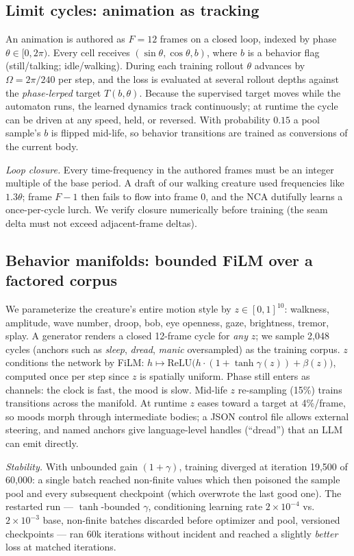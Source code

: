 \documentclass[11pt]{article}
\begin{document}
\subsection{Limit cycles: animation as tracking}
An animation is authored as $F{=}12$ frames on a closed loop, indexed by phase
$\theta \in [0, 2\pi)$. Every cell receives $(\sin\theta, \cos\theta, b)$,
where $b$ is a behavior flag (still/talking; idle/walking). During each
training rollout $\theta$ advances by $\Omega = 2\pi/240$ per step, and the
loss is evaluated at several rollout depths against the \emph{phase-lerped}
target $T(b, \theta)$. Because the supervised target moves while the automaton
runs, the learned dynamics track continuously; at runtime the cycle can be
driven at any speed, held, or reversed. With probability $0.15$ a pool
sample's $b$ is flipped mid-life, so behavior transitions are trained as
conversions of the current body.

\emph{Loop closure.} Every time-frequency in the authored frames must be an
integer multiple of the base period. A draft of our walking creature used
frequencies like $1.3\theta$; frame $F{-}1$ then fails to flow into frame $0$,
and the NCA dutifully learns a once-per-cycle lurch. We verify closure
numerically before training (the seam delta must not exceed adjacent-frame
deltas).

\subsection{Behavior manifolds: bounded FiLM over a factored corpus}
We parameterize the creature's entire motion style by
$z \in [0,1]^{10}$: walkness, amplitude, wave number, droop, bob, eye
openness, gaze, brightness, tremor, splay. A generator renders a closed
12-frame cycle for \emph{any} $z$; we sample 2{,}048 cycles (anchors such as
\textit{sleep}, \textit{dread}, \textit{manic} oversampled) as the training
corpus. $z$ conditions the network by FiLM: $h \mapsto
\mathrm{ReLU}\!\big(h \cdot (1+\tanh\gamma(z)) + \beta(z)\big)$, computed once
per step since $z$ is spatially uniform. Phase still enters as channels: the
clock is fast, the mood is slow. Mid-life $z$ re-sampling (15\%) trains
transitions across the manifold. At runtime $z$ eases toward a target at
4\%/frame, so moods morph through intermediate bodies; a JSON control file
allows external steering, and named anchors give language-level handles
(``dread'') that an LLM can emit directly.

\emph{Stability.} With unbounded gain $(1+\gamma)$, training diverged at
iteration 19{,}500 of 60{,}000: a single batch reached non-finite values which
then poisoned the sample pool and every subsequent checkpoint (which
overwrote the last good one). The restarted run --- $\tanh$-bounded $\gamma$,
conditioning learning rate $2\times10^{-4}$ vs.\ $2\times10^{-3}$ base,
non-finite batches discarded before optimizer and pool, versioned
checkpoints --- ran 60k iterations without incident and reached a slightly
\emph{better} loss at matched iterations.
\end{document}
